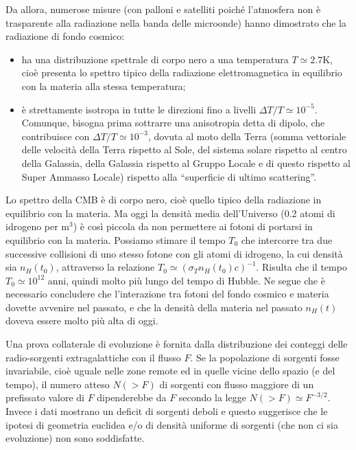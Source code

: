Da allora, numerose misure (con palloni e satelliti poiché l'atmosfera non è
trasparente alla radiazione nella banda delle microonde) hanno dimostrato che la
radiazione di fondo cosmico:
\begin{itemize}
\item ha una distribuzione spettrale di corpo nero a una temperatura $T \simeq
  2.7$K, cioè presenta lo spettro tipico della radiazione elettromagnetica in
  equilibrio con la materia alla stessa temperatura;
\item è strettamente isotropa in tutte le direzioni fino a livelli $\Delta T/T
  \simeq 10^{-5}$.  Comunque, bisogna prima sottrarre una anisotropia detta di
  dipolo, che contribuisce con $\Delta T/T \simeq 10^{-3}$, dovuta al moto della
  Terra (somma vettoriale delle velocità della Terra rispetto al Sole, del
  sistema solare rispetto al centro della Galassia, della Galassia rispetto al
  Gruppo Locale e di questo rispetto al Super Ammasso Locale) rispetto alla
  ``superficie di ultimo scattering''.
\end{itemize}
Lo spettro della CMB è di corpo nero, cioè quello tipico della radiazione in
equilibrio con la materia.  Ma oggi la densità media dell'Universo (0.2 atomi di
idrogeno per m$^3$) è così piccola da non permettere ai fotoni di portarsi in
equilibrio con la materia.  Possiamo stimare il tempo $T_0$ che intercorre tra
due successive collisioni di uno stesso fotone con gli atomi di idrogeno, la cui
densità sia $n_H(t_0)$, attraverso la relazione $T_0 \simeq (\sigma_T n_H(t_0)
c)^{-1}$.  Risulta che il tempo $T_0 \simeq 10^{12}$ anni, quindi molto più
lungo del tempo di Hubble.  Ne segue che è necessario concludere che
l'interazione tra fotoni del fondo cosmico e materia dovette avvenire nel
passato, e che la densità della materia nel passato $n_H(t)$ doveva essere molto
più alta di oggi.

Una prova collaterale di evoluzione è fornita dalla distribuzione dei conteggi
delle radio-sorgenti extragalattiche con il flusso $F$.  Se la popolazione di
sorgenti fosse invariabile, cioè uguale nelle zone remote ed in quelle vicine
dello spazio (e del tempo), il numero atteso $N(>F)$ di sorgenti con flusso
maggiore di un prefissato valore di $F$ dipenderebbe da $F$ secondo la legge
$N(>F) \simeq F^{-3/2}$.  Invece i dati mostrano un deficit di sorgenti deboli e
questo suggerisce che le ipotesi di geometria euclidea e/o di densità uniforme
di sorgenti (che non ci sia evoluzione) non sono soddisfatte.

